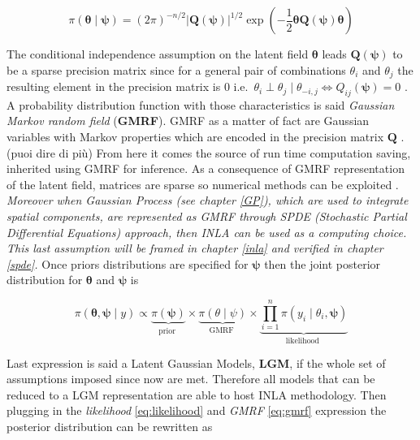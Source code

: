 \documentclass[
  12pt,
  a4paper,
  oneside]{book}
\theoremstyle{definition}
\theoremstyle{definition}
\theoremstyle{definition}
\theoremstyle{remark}
\begin{document}
\begin{equation}
\pi(\boldsymbol{\theta} \mid \boldsymbol{\psi})=(2 \pi)^{-n / 2}| \boldsymbol{Q(\psi)}|^{1 / 2} \exp \left(-\frac{1}{2} \boldsymbol{\theta} \boldsymbol{Q(\psi)} \boldsymbol{\theta}\right)
\label{eq:gmrf}
\end{equation}

The conditional independence assumption on the latent field \(\boldsymbol{\theta}\) leads \(\boldsymbol{Q(\psi)}\) to be a sparse precision matrix since for a general pair of combinations \(\theta_{i}\) and \(\theta_{j}\) the resulting element in the precision matrix is 0 i.e.~\(\theta_{i} \perp \theta_{j} \mid \theta_{-i, j} \Longleftrightarrow Q_{i j}(\boldsymbol{\psi})=0\) \citeyearpar{Blangiardo-Cameletti}.
A probability distribution function with those characteristics is said \emph{Gaussian Markov random field} (\textbf{GMRF}). GMRF as a matter of fact are Gaussian variables with Markov properties which are encoded in the precision matrix \(\boldsymbol{Q}\) \citep{Rue2009}. (puoi dire di più)
From here it comes the source of run time computation saving, inherited using GMRF for inference. As a consequence of GMRF representation of the latent field, matrices are sparse so numerical methods can be exploited \citep{Blangiardo-Cameletti}. \emph{Moreover when Gaussian Process (see chapter \ref{GP}), which are used to integrate spatial components, are represented as GMRF through SPDE (Stochastic Partial Differential Equations) approach, then INLA can be used as a computing choice. This last assumption will be framed in chapter \ref{inla} and verified in chapter \ref{spde}.}
Once priors distributions are specified for \(\boldsymbol{\psi}\) then the joint posterior distribution for \(\boldsymbol{\theta}\) and \(\boldsymbol{\psi}\) is

\[
\pi(\boldsymbol{\theta}, \boldsymbol{\psi} \mid y)\propto  \underbrace{\pi(\boldsymbol{\psi})}_{\text {prior }} \times \underbrace{\pi(\theta \mid \psi)}_{\text {GMRF }} \times \underbrace{\prod_{i=1}^{n} \pi\left(y_{i} \mid \theta_{i}, \boldsymbol{\psi}\right)}_{\text {likelihood }}
\]

Last expression is said a Latent Gaussian Models, \textbf{LGM}, if the whole set of assumptions imposed since now are met. Therefore all models that can be reduced to a LGM representation are able to host INLA methodology.
Then plugging in the \emph{likelihood} \eqref{eq:likelihood} and \emph{GMRF} \eqref{eq:gmrf} expression the posterior distribution can be rewritten as
\end{document}
